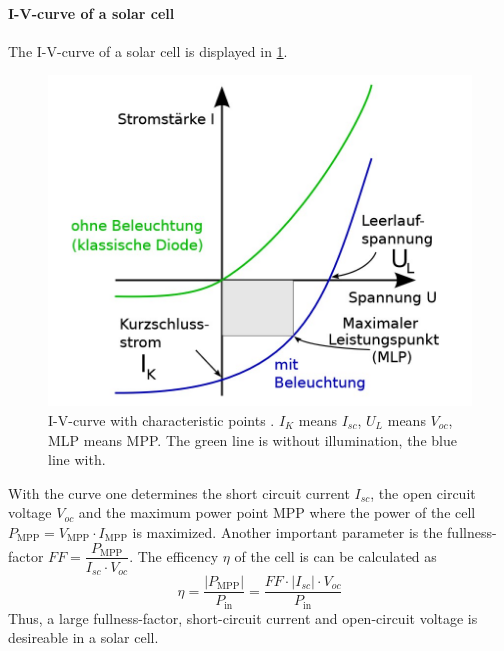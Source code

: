 \documentclass[english,  %
parskip=full,  %
headsepline]{scrartcl}
\begin{document}
\paragraph{I-V-curve of a solar cell}
The I-V-curve of a solar cell is displayed in \cref{fig:ivline}.
\begin{figure}[H]
    \centering
    \includegraphics[width=0.9\linewidth]{ivline.jpg}
    \caption{I-V-curve with characteristic points \cite{instructions}. $I_K$ means $I_{sc}$, $U_L$ means $V_{oc}$, MLP means MPP. The green line is without illumination, the blue line with.}
    \label{fig:ivline}
\end{figure}
With the curve one determines the short circuit current $I_{sc}$, the open circuit voltage $V_{oc}$ and the maximum power point MPP where the power of the cell $P_{\text{MPP}}=V_{\text{MPP}}\cdot I_{\text{MPP}}$ is maximized. Another important parameter is the fullness-factor $FF=\dfrac{P_{\text{MPP}}}{I_{sc}\cdot V_{oc}}$. The efficency $\eta$ of the cell is can be calculated as
\begin{equation}
    \eta=\frac{|P_{\text{MPP}}|}{P_{\text{in}}}=\frac{FF\cdot|I_{sc}|\cdot V_{oc}}{P_{\text{in}}} \label{eq:eta}
\end{equation}
Thus, a large fullness-factor, short-circuit current and open-circuit voltage is desireable in a solar cell.
\end{document}
